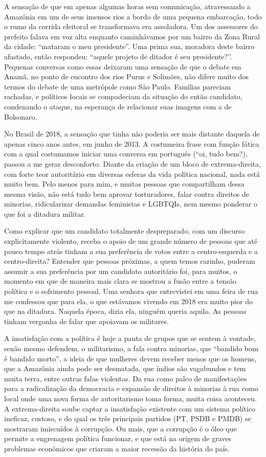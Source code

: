 A sensação de que em apenas algumas horas sem comunicação, atravessando
a Amazônia em um de seus imensos rios a bordo de uma pequena embarcação,
todo o rumo da corrida eleitoral se transformava era assoladora. Um dos
assessores do prefeito falava em voz alta enquanto caminhávamos por um
bairro da Zona Rural da cidade: ``mataram o meu presidente''. Uma prima
sua, moradora deste bairro afastado, então respondeu: ``aquele projeto
de ditador é seu presidente?''. Pequenas conversas como essas deixaram
uma sensação de que o debate em Anamã, no ponto de encontro dos rios
Purus e Solimões, não difere muito dos termos do debate de uma metrópole
como São Paulo. Famílias pareciam rachadas, e políticos locais se
compadeciam da situação do então candidato, condenando o ataque, na
esperança de relacionar suas imagens com a de Bolsonaro.

No Brasil de 2018, a sensação que tinha não poderia ser mais distante
daquela de apenas cinco anos antes, em junho de 2013. A costumeira frase
com função fática com a qual costumamos iniciar uma conversa em
português (``oi, tudo bem?), passou a me gerar desconforto. Diante da
criação de um bloco de extrema-direita, com forte teor autoritário em
diversas esferas da vida política nacional, nada está muito bem. Pelo
menos para mim, e muitas pessoas que compartilham dessa mesma visão, não
está tudo bem aprovar torturadores, falar contra direitos de minorias,
ridicularizar demandas feministas e LGBTQIs, nem mesmo ponderar o que
foi a ditadura militar.

Como explicar que um candidato totalmente despreparado, com um discurso
explicitamente violento, receba o apoio de um grande número de pessoas
que até pouco tempo atrás tinham a sua preferência de votos entre a
centro-esquerda e a centro-direita? Entender que pessoas próximas, a
quem temos carinho, puderam assumir a sua preferência por um candidato
autoritário foi, para muitos, o momento em que de maneira mais clara se
mostrou a fusão entre a tensão política e o sofrimento pessoal. Uma
senhora que entrevistei em uma feira de rua me confessou que para ela, o
que estávamos vivendo em 2018 era muito pior do que na ditadura. Naquela
época, dizia ela, ninguém queria aquilo. As pessoas tinham vergonha de
falar que apoiavam os militares.

A insatisfação com a política é hoje a pauta de grupos que se sentem à
vontade, senão mesmo defendem, o militarismo, a fala contra minorias,
que ``bandido bom é bandido morto'', a ideia de que mulheres devem
receber menos que os homens, que a Amazônia ainda pode ser desmatada,
que índios são vagabundos e tem muita terra, entre outras falas
violentas. Da rua como palco de manifestações para a radicalização da
democracia e expansão de direitos à minorias à rua como local onde uma
nova forma de autoritarismo toma forma, muita coisa aconteceu. A
extrema-direita soube captar a insatisfação existente com um sistema
político ineficaz, custoso, e do qual os três principais partidos (PT,
PSDB e PMDB) se mostraram imiscuídos à corrupção. Ou mais, que a
corrupção é o óleo que permite a engrenagem política funcionar, e que
está na origem de graves problemas econômicos que criaram a maior
recessão da história do país.

